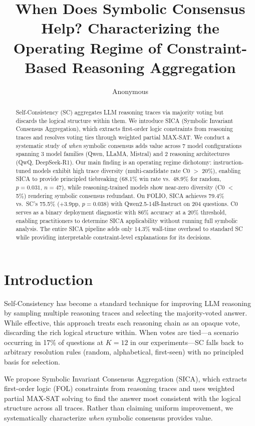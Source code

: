 \documentclass[11pt,a4paper]{article}
\title{When Does Symbolic Consensus Help? Characterizing the Operating Regime of Constraint-Based Reasoning Aggregation}
\author{Anonymous}
\begin{document}
\maketitle

\begin{abstract}
Self-Consistency (SC) aggregates LLM reasoning traces via majority voting but discards the logical structure within them.
We introduce SICA (Symbolic Invariant Consensus Aggregation), which extracts first-order logic constraints from reasoning traces and resolves voting ties through weighted partial MAX-SAT.
We conduct a systematic study of \emph{when} symbolic consensus adds value across 7 model configurations spanning 3 model families (Qwen, LLaMA, Mistral) and 2 reasoning architectures (QwQ, DeepSeek-R1).
Our main finding is an operating regime dichotomy: instruction-tuned models exhibit high trace diversity (multi-candidate rate C0 $>$ 20\%), enabling SICA to provide principled tiebreaking (68.1\% win rate vs.\ 48.9\% for random, $p=0.031$, $n=47$), while reasoning-trained models show near-zero diversity (C0 $<$ 5\%) rendering symbolic consensus redundant.
On FOLIO, SICA achieves 79.4\% vs.\ SC's 75.5\% (+3.9pp, $p=0.038$) with Qwen2.5-14B-Instruct on 204 questions.
C0 serves as a binary deployment diagnostic with 86\% accuracy at a 20\% threshold, enabling practitioners to determine SICA applicability without running full symbolic analysis.
The entire SICA pipeline adds only 14.3\% wall-time overhead to standard SC while providing interpretable constraint-level explanations for its decisions.
\end{abstract}

\section{Introduction}

Self-Consistency \cite{wang2023selfconsistency} has become a standard technique for improving LLM reasoning by sampling multiple reasoning traces and selecting the majority-voted answer. While effective, this approach treats each reasoning chain as an opaque vote, discarding the rich logical structure within. When votes are tied---a scenario occurring in 17\% of questions at $K=12$ in our experiments---SC falls back to arbitrary resolution rules (random, alphabetical, first-seen) with no principled basis for selection.

We propose Symbolic Invariant Consensus Aggregation (SICA), which extracts first-order logic (FOL) constraints from reasoning traces and uses weighted partial MAX-SAT solving to find the answer most consistent with the logical structure across all traces. Rather than claiming uniform improvement, we systematically characterize \emph{when} symbolic consensus provides value.
\end{document}
